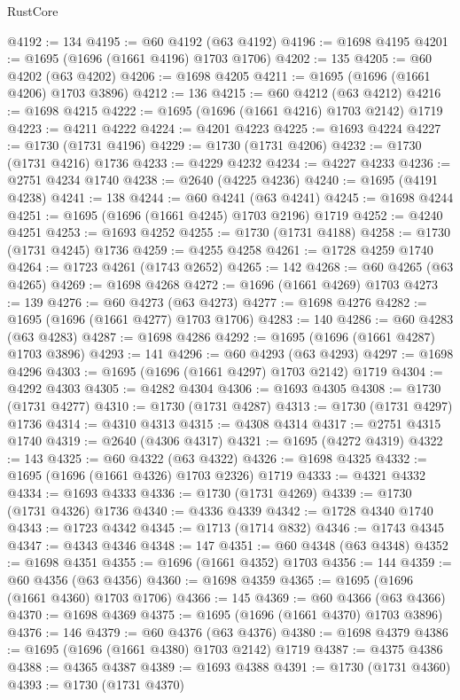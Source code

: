 \begin{lexlean}{RustCore}
\begin{coremodule}
@4192 := 134
@4195 := @60 @4192 (@63 @4192)
@4196 := @1698 @4195
@4201 := @1695 (@1696 (@1661 @4196) @1703 @1706)
@4202 := 135
@4205 := @60 @4202 (@63 @4202)
@4206 := @1698 @4205
@4211 := @1695 (@1696 (@1661 @4206) @1703 @3896)
@4212 := 136
@4215 := @60 @4212 (@63 @4212)
@4216 := @1698 @4215
@4222 := @1695 (@1696 (@1661 @4216) @1703 @2142) @1719
@4223 := @4211 @4222
@4224 := @4201 @4223
@4225 := @1693 @4224
@4227 := @1730 (@1731 @4196)
@4229 := @1730 (@1731 @4206)
@4232 := @1730 (@1731 @4216) @1736
@4233 := @4229 @4232
@4234 := @4227 @4233
@4236 := @2751 @4234 @1740
@4238 := @2640 (@4225 @4236)
@4240 := @1695 (@4191 @4238)
@4241 := 138
@4244 := @60 @4241 (@63 @4241)
@4245 := @1698 @4244
@4251 := @1695 (@1696 (@1661 @4245) @1703 @2196) @1719
@4252 := @4240 @4251
@4253 := @1693 @4252
@4255 := @1730 (@1731 @4188)
@4258 := @1730 (@1731 @4245) @1736
@4259 := @4255 @4258
@4261 := @1728 @4259 @1740
@4264 := @1723 @4261 (@1743 @2652)
@4265 := 142
@4268 := @60 @4265 (@63 @4265)
@4269 := @1698 @4268
@4272 := @1696 (@1661 @4269) @1703
@4273 := 139
@4276 := @60 @4273 (@63 @4273)
@4277 := @1698 @4276
@4282 := @1695 (@1696 (@1661 @4277) @1703 @1706)
@4283 := 140
@4286 := @60 @4283 (@63 @4283)
@4287 := @1698 @4286
@4292 := @1695 (@1696 (@1661 @4287) @1703 @3896)
@4293 := 141
@4296 := @60 @4293 (@63 @4293)
@4297 := @1698 @4296
@4303 := @1695 (@1696 (@1661 @4297) @1703 @2142) @1719
@4304 := @4292 @4303
@4305 := @4282 @4304
@4306 := @1693 @4305
@4308 := @1730 (@1731 @4277)
@4310 := @1730 (@1731 @4287)
@4313 := @1730 (@1731 @4297) @1736
@4314 := @4310 @4313
@4315 := @4308 @4314
@4317 := @2751 @4315 @1740
@4319 := @2640 (@4306 @4317)
@4321 := @1695 (@4272 @4319)
@4322 := 143
@4325 := @60 @4322 (@63 @4322)
@4326 := @1698 @4325
@4332 := @1695 (@1696 (@1661 @4326) @1703 @2326) @1719
@4333 := @4321 @4332
@4334 := @1693 @4333
@4336 := @1730 (@1731 @4269)
@4339 := @1730 (@1731 @4326) @1736
@4340 := @4336 @4339
@4342 := @1728 @4340 @1740
@4343 := @1723 @4342
@4345 := @1713 (@1714 @832)
@4346 := @1743 @4345
@4347 := @4343 @4346
@4348 := 147
@4351 := @60 @4348 (@63 @4348)
@4352 := @1698 @4351
@4355 := @1696 (@1661 @4352) @1703
@4356 := 144
@4359 := @60 @4356 (@63 @4356)
@4360 := @1698 @4359
@4365 := @1695 (@1696 (@1661 @4360) @1703 @1706)
@4366 := 145
@4369 := @60 @4366 (@63 @4366)
@4370 := @1698 @4369
@4375 := @1695 (@1696 (@1661 @4370) @1703 @3896)
@4376 := 146
@4379 := @60 @4376 (@63 @4376)
@4380 := @1698 @4379
@4386 := @1695 (@1696 (@1661 @4380) @1703 @2142) @1719
@4387 := @4375 @4386
@4388 := @4365 @4387
@4389 := @1693 @4388
@4391 := @1730 (@1731 @4360)
@4393 := @1730 (@1731 @4370)

\end{coremodule}
\end{lexlean}
